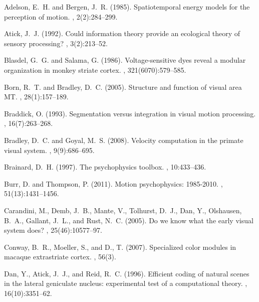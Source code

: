 \documentclass[a4paper,11pt]{article}%
\begin{document}
\begin{thebibliography}{}

Adelson, E.~H. and Bergen, J.~R. (1985).
\newblock Spatiotemporal energy models for the perception of motion.
, 2(2):284--299.

Atick, J.~J. (1992).
\newblock Could information theory provide an ecological theory of sensory
  processing?
, 3(2):213--52.

Blasdel, G.~G. and Salama, G. (1986).
\newblock Voltage-sensitive dyes reveal a modular organization in monkey
  striate cortex.
, 321(6070):579--585.

Born, R.~T. and Bradley, D.~C. (2005).
\newblock Structure and function of visual area {MT}.
, 28(1):157--189.

Braddick, O. (1993).
\newblock Segmentation versus integration in visual motion processing.
, 16(7):263--268.

Bradley, D.~C. and Goyal, M.~S. (2008).
\newblock Velocity computation in the primate visual system.
, 9(9):686--695.

Brainard, D.~H. (1997).
\newblock The psychophysics toolbox.
, 10:433--436.

Burr, D. and Thompson, P. (2011).
\newblock Motion psychophysics: 1985-2010.
, 51(13):1431--1456.

Carandini, M., Demb, J.~B., Mante, V., Tolhurst, D.~J., Dan, Y., Olshausen,
  B.~A., Gallant, J.~L., and Rust, N.~C. (2005).
\newblock Do we know what the early visual system does?
, 25(46):10577--97.

Conway, B.~R., Moeller, S., and D., T. (2007).
\newblock Specialized color modules in macaque extrastriate cortex.
, 56(3).

Dan, Y., Atick, J.~J., and Reid, R.~C. (1996).
\newblock Efficient coding of natural scenes in the lateral geniculate nucleus:
  experimental test of a computational theory.
, 16(10):3351--62.


\end{thebibliography}
\end{document}
